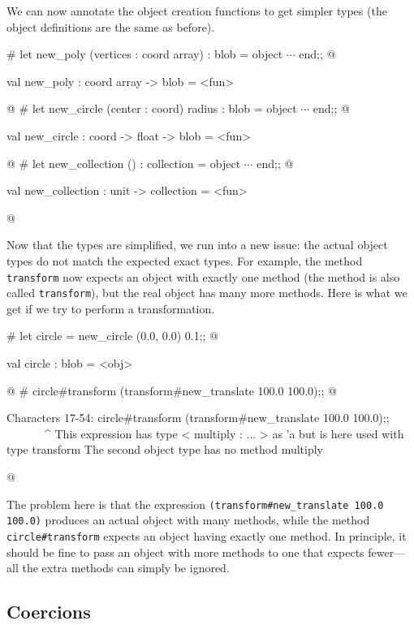 We can now annotate the object creation functions to get simpler types (the object definitions are
the same as before).

\begin{ocaml}
# let new_poly (vertices : coord array) : blob = object $\cdots$ end;;
@
\begin{topoutput}
val new_poly : coord array -> blob = <fun>
\end{topoutput}
@
# let new_circle (center : coord) radius : blob = object $\cdots$ end;;
@
\begin{topoutput}
val new_circle : coord -> float -> blob = <fun>
\end{topoutput}
@
# let new_collection () : collection = object $\cdots$ end;;
@
\begin{topoutput}
val new_collection : unit -> collection = <fun>
\end{topoutput}
@
\end{ocaml}
%
Now that the types are simplified, we run into a new issue: the actual object types do not match the
expected exact types.  For example, the method \hbox{\lstinline/transform/} now expects an object with
exactly one method (the method is also called \hbox{\lstinline/transform/}), but the real object has many more methods.
Here is what we get if we try to perform a transformation.

\begin{ocaml}
# let circle = new_circle (0.0, 0.0) 0.1;;
@
\begin{topoutput}
val circle : blob = <obj>
\end{topoutput}
@
# circle#transform (transform#new_translate 100.0 100.0);;
@
\begin{topoutput}
Characters 17-54:
  circle#transform (transform#new_translate 100.0 100.0);;
                   ^^^^^^^^^^^^^^^^^^^^^^^^^^^^^^^^^^^^^
This expression has type
  < multiply : ... > as 'a
but is here used with type transform
The second object type has no method multiply
\end{topoutput}
@
\end{ocaml}
%
The problem here is that the expression \hbox{\lstinline/(transform#new_translate 100.0 100.0)/} produces
an actual object with many methods, while the method \hbox{\lstinline/circle#transform/} expects an object
having exactly one method.  In principle, it should be fine to pass an object with more methods to
one that expects fewer---all the extra methods can simply be ignored.

\subsection{Coercions}

